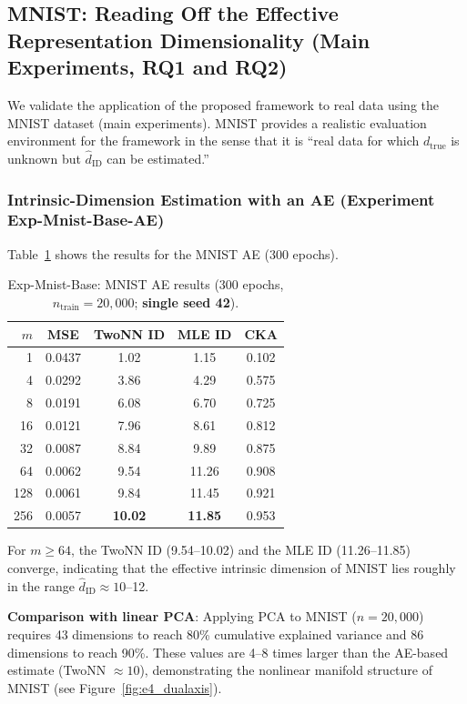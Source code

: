 \documentclass[make,article,submit,pdftex,moreauthors]{Definitions/mdpi}
\newcommand{\dtrue}{d_{\mathrm{true}}}
\begin{document}
\subsection{MNIST: Reading Off the Effective Representation Dimensionality (Main Experiments, RQ1 and RQ2)}\label{sec:exp_mnist}

We validate the application of the proposed framework to real data using the MNIST dataset (main experiments).
MNIST provides a realistic evaluation environment for the framework in the sense that it is
``real data for which $\dtrue$ is unknown but $\hat{d}_\mathrm{ID}$ can be estimated.''

\subsubsection{Intrinsic-Dimension Estimation with an AE (Experiment Exp-Mnist-Base-AE)}

Table~\ref{tab:e4_ae} shows the results for the MNIST AE (300 epochs).

\begin{table}[H]
\centering
\caption{Exp-Mnist-Base: MNIST AE results (300 epochs, $n_\mathrm{train}=20{,}000$; \textbf{single seed 42}).}
\label{tab:e4_ae}
\small
\begin{tabular}{rcccc}
\toprule
$m$ & MSE & TwoNN ID & MLE ID & CKA \\
\midrule
1   & 0.0437 & 1.02  & 1.15  & 0.102 \\
4   & 0.0292 & 3.86  & 4.29  & 0.575 \\
8   & 0.0191 & 6.08  & 6.70  & 0.725 \\
16  & 0.0121 & 7.96  & 8.61  & 0.812 \\
32  & 0.0087 & 8.84  & 9.89  & 0.875 \\
64  & 0.0062 & 9.54  & 11.26 & 0.908 \\
128 & 0.0061 & 9.84  & 11.45 & 0.921 \\
256 & 0.0057 & \textbf{10.02} & \textbf{11.85} & 0.953 \\
\bottomrule
\end{tabular}
\end{table}

For $m \geq 64$, the TwoNN ID (9.54--10.02) and the MLE ID (11.26--11.85) converge,
indicating that the effective intrinsic dimension of MNIST lies roughly in the range
$\hat{d}_\mathrm{ID} \approx 10$--12.

\textbf{Comparison with linear PCA}:
Applying PCA to MNIST ($n = 20{,}000$) requires 43 dimensions to reach 80\% cumulative
explained variance and 86 dimensions to reach 90\%.
These values are 4--8 times larger than the AE-based estimate (TwoNN $\approx 10$),
demonstrating the nonlinear manifold structure of MNIST (see Figure~\ref{fig:e4_dualaxis}).
\end{document}
